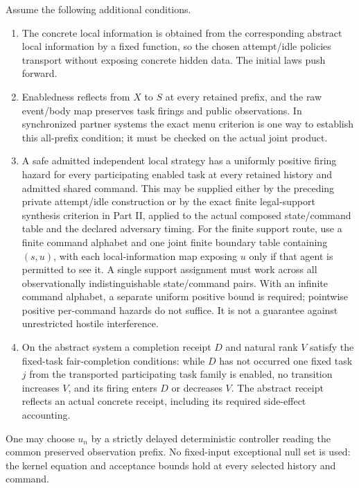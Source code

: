 \documentclass[11pt]{article}
\begin{document}
Assume the following additional conditions.
\begin{enumerate}
\item The concrete local information is obtained from the corresponding abstract local information by a fixed function, so the chosen attempt/idle policies transport without exposing concrete hidden data. The initial laws push forward.
\item Enabledness reflects from $X$ to $S$ at every retained prefix, and the raw event/body map preserves task firings and public observations. In synchronized partner systems the exact menu criterion is one way to establish this all-prefix condition; it must be checked on the actual joint product.
\item A safe admitted independent local strategy has a uniformly positive firing hazard for every participating enabled task at every retained history and admitted shared command. This may be supplied either by the preceding private attempt/idle construction or by the exact finite legal-support synthesis criterion in Part II, applied to the actual composed state/command table and the declared adversary timing. For the finite support route, use a finite command alphabet and one joint finite boundary table containing $(s,u)$, with each local-information map exposing $u$ only if that agent is permitted to see it. A single support assignment must work across all observationally indistinguishable state/command pairs. With an infinite command alphabet, a separate uniform positive bound is required; pointwise positive per-command hazards do not suffice. It is not a guarantee against unrestricted hostile interference.
\item On the abstract system a completion receipt $D$ and natural rank $V$ satisfy the fixed-task fair-completion conditions: while $D$ has not occurred one fixed task $j$ from the transported participating task family is enabled, no transition increases $V$, and its firing enters $D$ or decreases $V$. The abstract receipt reflects an actual concrete receipt, including its required side-effect accounting.
\end{enumerate}
One may choose $u_n$ by a strictly delayed deterministic controller reading the common preserved observation prefix. No fixed-input exceptional null set is used: the kernel equation and acceptance bounds hold at every selected history and command.
\end{document}
